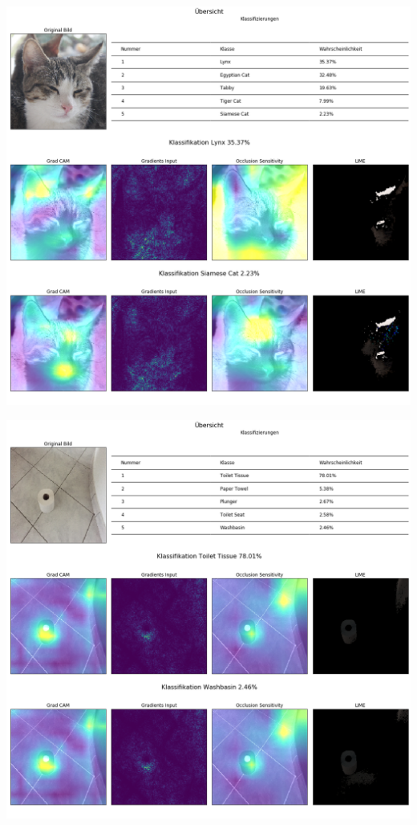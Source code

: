 \documentclass[
  12pt, %
  a4paper, %
  oneside, %
  openany, 
  numbers=noenddot, %
  BCOR=5mm, %
  parskip=half*, %
  thesis, %
]{bfhbook}
\begin{document}
\begin{center}
\begin{minipage}[t]{\linewidth}
\includegraphics[width=\textwidth]{Bilder/Merlin-Classification.png}
\end{minipage}
\end{center}

\begin{center}
\begin{minipage}[t]{\linewidth}
\includegraphics[width=\textwidth]{Bilder/Toilett-Tissue-Classification.png}
\end{minipage}
\end{center}
\end{document}
